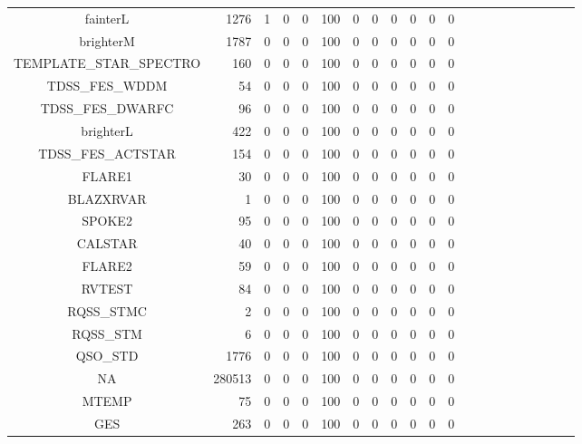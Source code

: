 \documentclass[onecolumn]{aa}
\begin{document}
\begin{center}
\begin{longtable}{c rrr rrr rrrrrrrrrrrrrr}
fainterL & 1276 & 1 & 0 & 0 & 100 & 0 & 0 & 0 & 0 & 0 & 0 \\ 
brighterM & 1787 & 0 & 0 & 0 & 100 & 0 & 0 & 0 & 0 & 0 & 0 \\ 
TEMPLATE\_STAR\_SPECTRO & 160 & 0 & 0 & 0 & 100 & 0 & 0 & 0 & 0 & 0 & 0 \\ 
TDSS\_FES\_WDDM & 54 & 0 & 0 & 0 & 100 & 0 & 0 & 0 & 0 & 0 & 0 \\ 
TDSS\_FES\_DWARFC & 96 & 0 & 0 & 0 & 100 & 0 & 0 & 0 & 0 & 0 & 0 \\ 
brighterL & 422 & 0 & 0 & 0 & 100 & 0 & 0 & 0 & 0 & 0 & 0 \\ 
TDSS\_FES\_ACTSTAR & 154 & 0 & 0 & 0 & 100 & 0 & 0 & 0 & 0 & 0 & 0 \\ 
FLARE1 & 30 & 0 & 0 & 0 & 100 & 0 & 0 & 0 & 0 & 0 & 0 \\ 
BLAZXRVAR & 1 & 0 & 0 & 0 & 100 & 0 & 0 & 0 & 0 & 0 & 0 \\ 
SPOKE2 & 95 & 0 & 0 & 0 & 100 & 0 & 0 & 0 & 0 & 0 & 0 \\ 
CALSTAR & 40 & 0 & 0 & 0 & 100 & 0 & 0 & 0 & 0 & 0 & 0 \\ 
FLARE2 & 59 & 0 & 0 & 0 & 100 & 0 & 0 & 0 & 0 & 0 & 0 \\ 
RVTEST & 84 & 0 & 0 & 0 & 100 & 0 & 0 & 0 & 0 & 0 & 0 \\ 
RQSS\_STMC & 2 & 0 & 0 & 0 & 100 & 0 & 0 & 0 & 0 & 0 & 0 \\ 
RQSS\_STM & 6 & 0 & 0 & 0 & 100 & 0 & 0 & 0 & 0 & 0 & 0 \\ 
QSO\_STD & 1776 & 0 & 0 & 0 & 100 & 0 & 0 & 0 & 0 & 0 & 0 \\ 
NA & 280513 & 0 & 0 & 0 & 100 & 0 & 0 & 0 & 0 & 0 & 0 \\ 
MTEMP & 75 & 0 & 0 & 0 & 100 & 0 & 0 & 0 & 0 & 0 & 0 \\ 
GES & 263 & 0 & 0 & 0 & 100 & 0 & 0 & 0 & 0 & 0 & 0 \\ 
\hline
\end{longtable}
\end{center}
\end{document}
